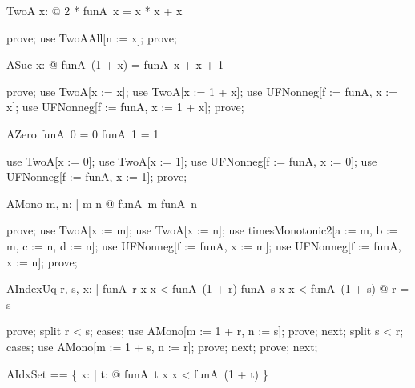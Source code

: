 \documentclass{article}
\begin{document}
\begin{theorem}{TwoA}
  \forall x: \nat @ 2 * funA~x = x * x + x
\end{theorem}

\begin{zproof}
prove;
use TwoAAll[n := x];
prove;
\end{zproof}

\begin{theorem}{ASuc}
  \forall x: \nat @ funA~(1 + x) = funA~x + x + 1
\end{theorem}

\begin{zproof}
prove;
use TwoA[x := x];
use TwoA[x := 1 + x];
use UFNonneg[f := funA, x := x];
use UFNonneg[f := funA, x := 1 + x];
prove;
\end{zproof}

\begin{theorem}{AZero}
  funA~0 = 0 \land funA~1 = 1
\end{theorem}

\begin{zproof}
use TwoA[x := 0];
use TwoA[x := 1];
use UFNonneg[f := funA, x := 0];
use UFNonneg[f := funA, x := 1];
prove;
\end{zproof}

\begin{theorem}{AMono}
  \forall m, n: \nat | m \leq n @ funA~m \leq funA~n
\end{theorem}

\begin{zproof}
prove;
use TwoA[x := m];
use TwoA[x := n];
use timesMonotonic2[a := m, b := m, c := n, d := n];
use UFNonneg[f := funA, x := m];
use UFNonneg[f := funA, x := n];
prove;
\end{zproof}

\begin{theorem}{AIndexUq}
  \forall r, s, x: \nat | funA~r \leq x \land x < funA~(1 + r) \land funA~s \leq x \land x < funA~(1 + s)
    @ r = s
\end{theorem}

\begin{zproof}
prove;
split r < s;
cases;
use AMono[m := 1 + r, n := s];
prove;
next;
split s < r;
cases;
use AMono[m := 1 + s, n := r];
prove;
next;
prove;
next;
\end{zproof}

\begin{zed}
  AIdxSet == \{ x: \nat | \exists t: \nat @ funA~t \leq x \land x < funA~(1 + t) \}
\end{zed}
\end{document}
